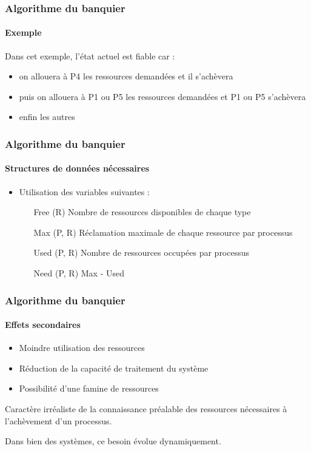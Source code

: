 \begin{frame}
\frametitle{Algorithme du banquier}
\framesubtitle{Exemple}
Dans cet exemple, l'état actuel est fiable car :
\begin{itemize}
\item on allouera à P4 les ressources demandées et il s'achèvera
\item puis on allouera à P1 ou P5 les ressources demandées et P1 ou P5 s'achèvera
\item enfin les autres
\end{itemize}
\end{frame}

\begin{frame}
\frametitle{Algorithme du banquier}
\framesubtitle{Structures de données nécessaires}
\begin{itemize}
\item Utilisation des variables suivantes :
\begin{itemize}
\item [Free (R)] Nombre de ressources disponibles de chaque type
\item [Max (P, R)] Réclamation maximale de chaque ressource par processus
\item [Used (P, R)] Nombre de ressources occupées par processus
\item [Need (P, R)] Max - Used
\end{itemize}
\end{itemize}
\end{frame}

\begin{frame}
\frametitle{Algorithme du banquier}
\framesubtitle{Effets secondaires}
\begin{itemize}
\item Moindre utilisation des ressources
\item Réduction de la capacité de traitement du système
\item Possibilité d’une famine de ressources
\end{itemize}

Caractère irréaliste de la connaissance préalable des ressources nécessaires à l'achèvement d'un processus.

Dans bien des systèmes, ce besoin évolue dynamiquement.
\end{frame}

